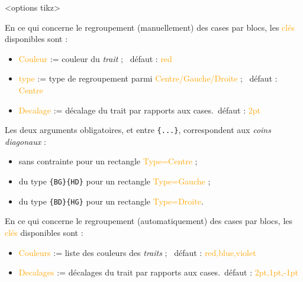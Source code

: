 \documentclass[french,a4paper,11pt]{article}
\newcommand\Cle[1]{{\small\sffamily\textlangle \textcolor{orange}{#1}\textrangle}}
\begin{document}
{{\begin{DemoCode}
\begin{TableKarnaugh}[clés]<options tikz>
\end{TableKarnaugh}
\end{DemoCode}

\begin{tipblock}
En ce qui concerne le regroupement (manuellement) des cases par blocs, les \Cle{clés} disponibles sont :

\begin{itemize}
	\item \Cle{Couleur} := couleur du \textit{trait} ; \hfill~défaut : \Cle{red}
	\item \Cle{type} := type de regroupement parmi \Cle{Centre/Gauche/Droite} ; \hfill~défaut : \Cle{Centre}
	\item \Cle{Decalage} := décalage du trait par rapports aux cases.\hfill~défaut : \Cle{2pt}
\end{itemize}

Les deux arguments obligatoires, et entre \texttt{\{...\}}, correspondent aux \textit{coins diagonaux} :

\begin{itemize}
	\item sans contrainte pour un rectangle \Cle{Type=Centre} ;
	\item du type \texttt{\{BG\}\{HD\}} pour un rectangle \Cle{Type=Gauche} ;
	\item du type \texttt{\{BD\}\{HG\}} pour un rectangle \Cle{Type=Droite}.
\end{itemize}
\vspace*{-\baselineskip}\leavevmode
\end{tipblock}

\begin{tipblock}
En ce qui concerne le regroupement (automatiquement) des cases par blocs, les \Cle{clés} disponibles sont :

\begin{itemize}
	\item \Cle{Couleurs} := liste des couleurs des \textit{traits} ; \hfill~défaut : \Cle{red,blue,violet}
	\item \Cle{Decalages} := décalages du trait par rapports aux cases.\hfill~défaut : \Cle{2pt,1pt,-1pt}
\end{itemize}


\end{tipblock}}}
\end{document}

